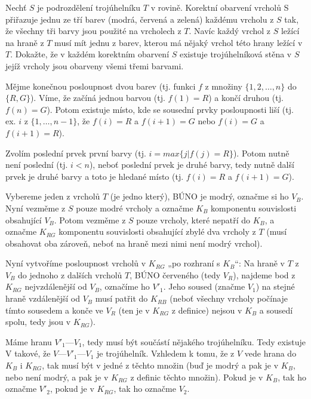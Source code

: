 \documentclass[12pt]{article}					%
\begin{document}
\begin{priklad}[2.3]
	Nechť $S$ je podrozdělení trojúhelníku $T$ v rovině. Korektní obarvení vrcholů S přiřazuje jednu ze tří barev (modrá, červená a zelená) každému vrcholu z $S$ tak, že všechny tři barvy jsou použité na vrcholech z $T$. Navíc každý vrchol z $S$ ležící na hraně z $T$ musí mít jednu z barev, kterou má nějaký vrchol této hrany ležící v $T$. Dokažte, že v každém korektním obarvení $S$ existuje trojúhelníková stěna v $S$ jejíž vrcholy jsou obarveny všemi třemi barvami.

	\begin{lemmain}
		Mějme konečnou posloupnost dvou barev (tj. funkci $f$ z množiny $\{1, 2, …, n\}$ do $\{R, G\}$). Víme, že začíná jednou barvou (tj. $f(1) = R$) a končí druhou (tj. $f(n) = G$). Potom existuje místo, kde se sousední prvky posloupnosti liší (tj. ex. $i$ z $\{1, …, n-1\}$, že $f(i) = R$ a $f(i+1) = G$ nebo $f(i) = G$ a $f(i+1) = R$).

		\begin{dukazin}
			Zvolím poslední prvek první barvy (tj. $i = max \{j | f(j) = R\}$). Potom nutně není poslední (tj. $i < n$), neboť poslední prvek je druhé barvy, tedy nutně další prvek je druhé barvy a toto je hledané místo (tj. $f(i) = R$ a $f(i+1) = G$).
		\end{dukazin}
	\end{lemmain}


	\begin{dukazin}
		Vybereme jeden z vrcholů $T$ (je jedno který), BÚNO je modrý, označme si ho $V_B$. Nyní vezměme z $S$ pouze modré vrcholy a označme $K_B$ komponentu souvislosti obsahující $V_B$. Potom vezměme z $S$ pouze vrcholy, které nepatří do $K_B$, a označme $K_{RG}$ komponentu souvislosti obsahující zbylé dva vrcholy z $T$ (musí obsahovat oba zároveň, neboť na hraně mezi nimi není modrý vrchol).

		Nyní vytvoříme posloupnost vrcholů v $K_{RG}$ „po rozhraní s $K_B$“: Na hraně v $T$ z $V_B$ do jednoho z dalších vrcholů $T$, BÚNO červeného (tedy $V_R$), najdeme bod z $K_{RG}$ nejvzdálenější od $V_B$, označíme ho $V'_1$. Jeho soused (značme $V_1$) na stejné hraně vzdálenější od $V_B$ musí patřit do $K_{RB}$ (neboť všechny vrcholy počínaje tímto sousedem a konče ve $V_R$ (ten je v $K_{RG}$ z definice) nejsou v $K_B$ a sousedí spolu, tedy jsou v $K_{RG}$).

		Máme hranu $V'_1 — V_1$, tedy musí být součástí nějakého trojúhelníku. Tedy existuje V takové, že $V — V'_1 — V_1$ je trojúhelník. Vzhledem k tomu, že z $V$ vede hrana do $K_B$ i $K_{RG}$, tak musí být v jedné z těchto množin (buď je modrý a pak je v $K_B$, nebo není modrý, a pak je v $K_{RG}$ z definic těchto množin). Pokud je v $K_B$, tak ho označme $V'_2$, pokud je v $K_{RG}$, tak ho označme $V_2$.


\end{dukazin}
\end{priklad}
\end{document}
